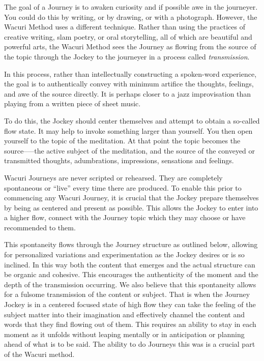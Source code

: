 \documentclass[12pt]{book}
\begin{document}
The goal of a Journey is to awaken curiosity and if possible awe
in the journeyer.  You could do this by writing, or by drawing, or
with a photograph.  However, the Wacuri Method uses a different
technique. Rather than using the practices of creative writing, slam
poetry, or oral storytelling, all of which are beautiful and powerful
arts, the Wacuri Method sees the Journey as flowing from the source of
the topic through the Jockey to the journeyer in a process called {\em
  transmission}.
					
In this process, rather than intellectually constructing a spoken-word
experience, the goal is to authentically convey with minimum artifice
the thoughts, feelings, and awe of the source directly. It is perhaps
closer to a jazz improvisation than playing from a written piece of sheet
music.
					
To do this, the Jockey should center themselves and attempt to obtain
a so-called flow state. It may help to invoke something larger than
yourself. You then open yourself to the topic of the meditation. At
that point the topic becomes the source--—the active subject of the
meditation, and the source of the conveyed or transmitted thoughts,
adumbrations, impressions, sensations and feelings.

Wacuri Journeys are never scripted or rehearsed. They are completely
spontaneous or “live” every time there are produced. To enable this
prior to commencing any Wacuri Journey, it is crucial that the Jockey
prepare themselves by being as centered and present as possible. This
allows the Jockey to enter into a higher flow, connect with the
Journey topic which they may choose or have recommended to them.

This spontaneity flows through the Journey structure as outlined
below, allowing for personalized variations and experimentation as the
Jockey desires or is so inclined. In this way both the content that
emerges and the actual structure can be organic and cohesive. This
encourages the authenticity of the moment and the depth of the
transmission occurring.  We also believe that this spontaneity allows
for a fulsome transmission of the content or subject. That is when the
Journey Jockey is in a centered focused state of high flow they can
take the feeling of the subject matter into their imagination and
effectively channel the content and words that they find flowing out
of them. This requires an ability to stay in each moment as it unfolds
without leaping mentally or in anticipation or planning ahead of what
is to be said.  The ability to do Journeys this was is a crucial part
of the Wacuri method.
					
\end{document}
